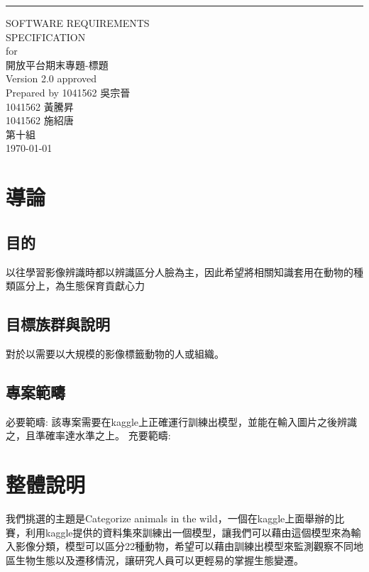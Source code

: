 \documentclass{scrreprt}
\date{}
\def\myversion{2.0 }
\begin{document}
\begin{CJK}{UTF8}{}
\begin{flushright}
    \rule{16cm}{5pt}\vskip1cm
    \begin{bfseries}
        \Huge{SOFTWARE REQUIREMENTS\\ SPECIFICATION}\\
        \vspace{1.8cm}
        for\\
        \vspace{1.8cm}
        開放平台期末專題-標題\\
        \vspace{1.8cm}
        \LARGE{Version \myversion approved}\\
        Prepared by 1041562 吳宗晉\\
        1041562 黃騰昇\\
        1041562 施紹唐\\
        \vspace{1.8cm}
        第十組\\
        \vspace{1.8cm}
        \today\\
    \end{bfseries}
\end{flushright}

\tableofcontents

\chapter{導論}

\section{目的}
以往學習影像辨識時都以辨識區分人臉為主，因此希望將相關知識套用在動物的種類區分上，為生態保育貢獻心力

\section{目標族群與說明}
對於以需要以大規模的影像標籤動物的人或組織。

\section{專案範疇}
必要範疇: 該專案需要在kaggle上正確運行訓練出模型，並能在輸入圖片之後辨識之，且準確率達水準之上。
充要範疇: 

\chapter{整體說明}
我們挑選的主題是Categorize animals in the wild，一個在kaggle上面舉辦的比賽，利用kaggle提供的資料集來訓練出一個模型，讓我們可以藉由這個模型來為輸入影像分類，模型可以區分22種動物，希望可以藉由訓練出模型來監測觀察不同地區生物生態以及遷移情況，讓研究人員可以更輕易的掌握生態變遷。


\end{CJK}
\end{document}
